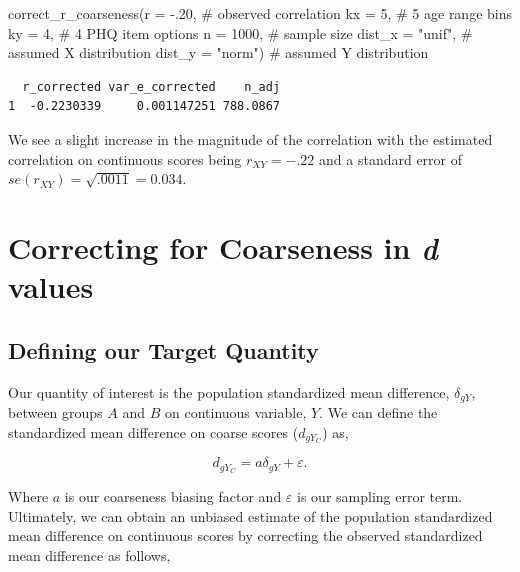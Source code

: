 \documentclass[
  letterpaper,
  DIV=11,
  numbers=noendperiod]{scrreprt}
\newenvironment{Shaded}{}{}
\newcommand{\AttributeTok}[1]{\textcolor[rgb]{0.00,0.34,0.68}{#1}}
\newcommand{\CommentTok}[1]{\textcolor[rgb]{0.54,0.53,0.53}{#1}}
\newcommand{\DecValTok}[1]{\textcolor[rgb]{0.69,0.50,0.00}{#1}}
\newcommand{\FunctionTok}[1]{\textcolor[rgb]{0.39,0.29,0.61}{#1}}
\newcommand{\NormalTok}[1]{\textcolor[rgb]{0.12,0.11,0.11}{#1}}
\newcommand{\SpecialCharTok}[1]{\textcolor[rgb]{0.24,0.68,0.91}{#1}}
\newcommand{\StringTok}[1]{\textcolor[rgb]{0.75,0.01,0.01}{#1}}
\begin{document}
\begin{tcolorbox}
\begin{Shaded}
\begin{Highlighting}[]
\FunctionTok{correct\_r\_coarseness}\NormalTok{(}\AttributeTok{r =} \SpecialCharTok{{-}}\NormalTok{.}\DecValTok{20}\NormalTok{, }\CommentTok{\# observed correlation}
                     \AttributeTok{kx =} \DecValTok{5}\NormalTok{, }\CommentTok{\# 5 age range bins}
                     \AttributeTok{ky =} \DecValTok{4}\NormalTok{,  }\CommentTok{\# 4 PHQ item options}
                     \AttributeTok{n =} \DecValTok{1000}\NormalTok{, }\CommentTok{\# sample size}
                     \AttributeTok{dist\_x =} \StringTok{"unif"}\NormalTok{, }\CommentTok{\# assumed X distribution}
                     \AttributeTok{dist\_y =} \StringTok{"norm"}\NormalTok{) }\CommentTok{\# assumed Y distribution}
\end{Highlighting}
\end{Shaded}

\begin{verbatim}
  r_corrected var_e_corrected    n_adj
1  -0.2230339     0.001147251 788.0867
\end{verbatim}

We see a slight increase in the magnitude of the correlation with the
estimated correlation on continuous scores being \(r_{XY}=-.22\) and a
standard error of \(se(r_{XY})=\sqrt{.0011}=0.034\).

\end{tcolorbox}

\hypertarget{correcting-for-coarseness-in-d-values}{%
\section{\texorpdfstring{Correcting for Coarseness in \emph{d}
values}{Correcting for Coarseness in d values}}\label{correcting-for-coarseness-in-d-values}}

\hypertarget{defining-our-target-quantity-3}{%
\subsection{Defining our Target
Quantity}\label{defining-our-target-quantity-3}}

Our quantity of interest is the population standardized mean difference,
\(\delta_{gY}\), between groups \(A\) and \(B\) on continuous variable,
\(Y\). We can define the standardized mean difference on coarse scores
(\(d_{gY_C}\)) as,

\[
d_{gY_C} = a\delta_{gY}+\varepsilon.
\]

Where \(a\) is our coarseness biasing factor and \(\varepsilon\) is our
sampling error term. Ultimately, we can obtain an unbiased estimate of
the population standardized mean difference on continuous scores by
correcting the observed standardized mean difference as follows,
\end{document}
